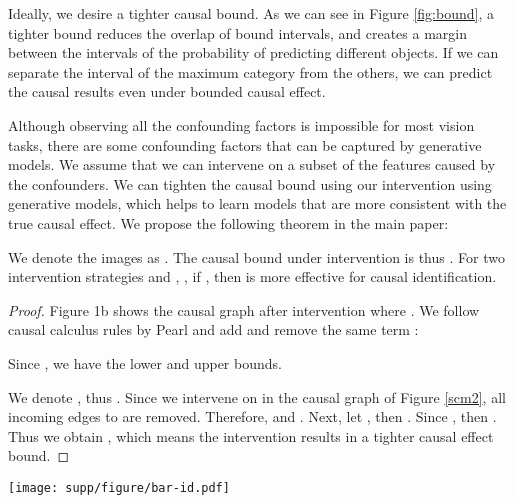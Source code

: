 \documentclass[final]{cvpr}
\begin{document}
\begin{subappendices}
Ideally, we desire a tighter causal bound. As we can see in Figure \ref{fig:bound}, a tighter bound reduces the overlap of bound intervals, and creates a margin between the intervals of the probability of predicting different objects. If we can separate the interval of the maximum category from the others, we can predict the causal results even under bounded causal effect.

Although observing all the confounding factors is impossible for most vision tasks, there are some confounding factors that can be captured by generative models. We assume that we can intervene on a subset of the features caused by the confounders. We can tighten the causal bound using our intervention using generative models, which helps to learn models that are more consistent with the true causal effect. We propose the following theorem in the main paper:

\begin{theorem}\label{th:2IV}
We denote the images as . The causal bound under intervention  is thus . For two intervention strategies  and ,  , if  , then  is more effective for causal identification. 


\end{theorem}\vspace{-1em}\begin{proof}
Figure 1b shows the causal graph after intervention where .  We follow causal calculus rules by Pearl \cite{pearl} and add and remove the same term :

Since , we have the lower and upper bounds.






We denote , thus  . Since we intervene on  in the causal graph of Figure \ref{scm2}, all incoming edges  to  are removed. Therefore,  and . Next, let , then . Since , then . Thus we obtain , which means the intervention  results in a tighter causal effect bound.
\end{proof}



\begin{figure*}
  \centering
  \texttt{[image: supp/figure/bar-id.pdf]}  
  \vspace{-5mm}
  \caption{Tightened identification bound reduces the overlap on the bound for probabilities of the predicted labels, which results in correct recognition when the bounds do not overlap. }
\label{fig:bound}
\end{figure*}



\end{subappendices}
\end{document}
